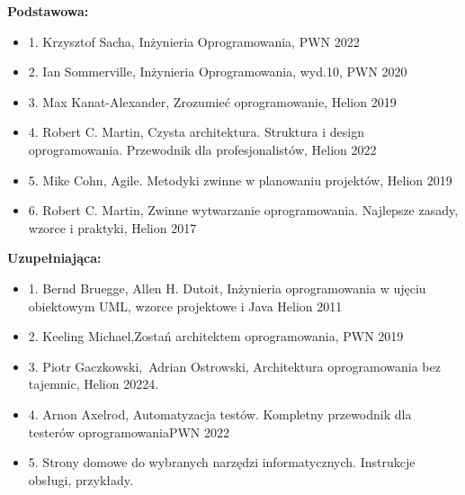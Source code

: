 \documentclass[12pt, a4paper]{article}
\begin{document}
\textbf{Podstawowa:}
\begin{itemize}
  \item 1. Krzysztof Sacha,  Inżynieria Oprogramowania, PWN 2022
  \item 2. Ian Sommerville,  Inżynieria Oprogramowania, wyd.10, PWN 2020
  \item 3. Max Kanat-Alexander, Zrozumieć oprogramowanie, Helion 2019
  \item 4. Robert C. Martin, Czysta architektura. Struktura i design oprogramowania. Przewodnik dla profesjonalistów, Helion 2022
  \item 5. Mike Cohn, Agile. Metodyki zwinne w planowaniu projektów, Helion 2019
  \item 6. Robert C. Martin, Zwinne wytwarzanie oprogramowania. Najlepsze zasady, wzorce i praktyki, Helion 2017
\end{itemize}

\textbf{Uzupełniająca:}
\begin{itemize}
  \item 1. Bernd Bruegge,  Allen H. Dutoit, Inżynieria oprogramowania w ujęciu obiektowym UML, wzorce projektowe i Java Helion 2011
  \item 2. Keeling Michael,Zostań architektem oprogramowania, PWN 2019
  \item 3. Piotr Gaczkowski, Adrian Ostrowski, Architektura oprogramowania bez tajemnic, Helion 20224.
  \item 4. Arnon Axelrod, Automatyzacja testów. Kompletny przewodnik dla testerów oprogramowaniaPWN 2022
  \item 5. Strony domowe do wybranych narzędzi informatycznych. Instrukcje obsługi, przykłady.
\end{itemize}
\end{document}
